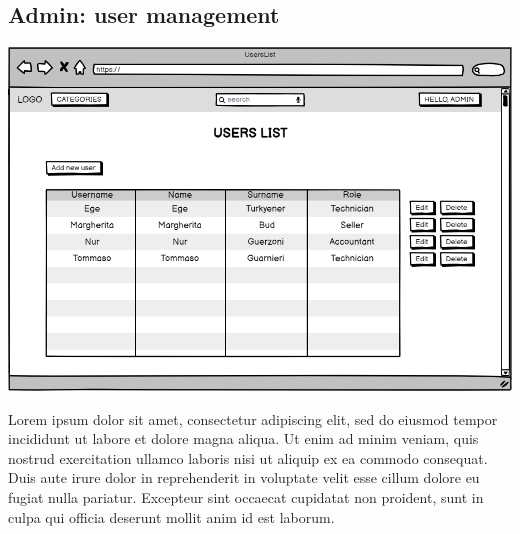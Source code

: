 \subsection{Admin: user management}
    \includegraphics[width=\textwidth,height=\textheight,keepaspectratio]{mockups/usersListPageMockup.png}

    Lorem ipsum dolor sit amet, consectetur adipiscing elit, sed do eiusmod tempor incididunt ut labore et dolore magna aliqua. Ut enim ad minim veniam, quis nostrud exercitation ullamco laboris nisi ut aliquip ex ea commodo consequat. Duis aute irure dolor in reprehenderit in voluptate velit esse cillum dolore eu fugiat nulla pariatur. Excepteur sint occaecat cupidatat non proident, sunt in culpa qui officia deserunt mollit anim id est laborum.

